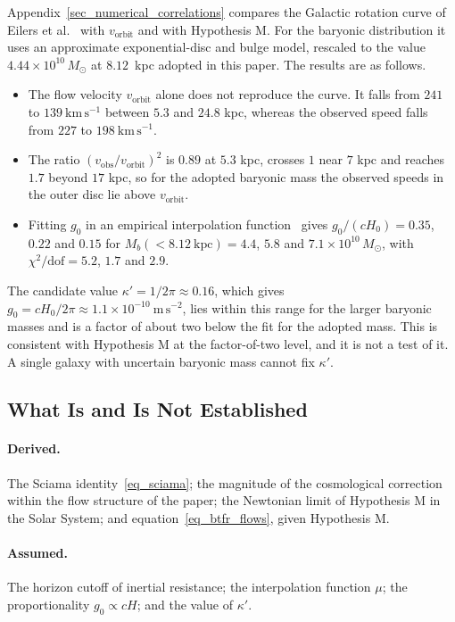 \documentclass[pdflatex,sn-mathphys-num]{sn-jnl}%
\theoremstyle{thmstyleone}%
\theoremstyle{thmstyletwo}%
\theoremstyle{thmstylethree}%
\begin{document}
Appendix~\ref{sec_numerical_correlations} compares the Galactic rotation curve of Eilers et al.~\cite{Eilers_2019} with $v_{\mathrm{orbit}}$ and with Hypothesis M. For the baryonic distribution it uses an approximate exponential-disc and bulge model, rescaled to the value $4.44\times10^{10}\,M_\odot$ at $8.12$~kpc adopted in this paper. The results are as follows.
\begin{itemize}
\item The flow velocity $v_{\mathrm{orbit}}$ alone does not reproduce the curve. It falls from $241$ to $139~\mathrm{km\,s^{-1}}$ between $5.3$ and $24.8$ kpc, whereas the observed speed falls from $227$ to $198~\mathrm{km\,s^{-1}}$.
\item The ratio $(v_{\mathrm{obs}}/v_{\mathrm{orbit}})^{2}$ is $0.89$ at $5.3$ kpc, crosses $1$ near $7$ kpc and reaches $1.7$ beyond $17$ kpc, so for the adopted baryonic mass the observed speeds in the outer disc lie above $v_{\mathrm{orbit}}$.
\item Fitting $g_0$ in an empirical interpolation function~\cite{McGaugh2016RAR} gives $g_0/(cH_0)=0.35$, $0.22$ and $0.15$ for $M_b(<8.12~\mathrm{kpc})=4.4$, $5.8$ and $7.1\times10^{10}\,M_\odot$, with $\chi^{2}/\mathrm{dof}=5.2$, $1.7$ and $2.9$.
\end{itemize}
The candidate value $\kappa'=1/2\pi\approx0.16$, which gives $g_0=cH_0/2\pi\approx1.1\times10^{-10}~\mathrm{m\,s^{-2}}$, lies within this range for the larger baryonic masses and is a factor of about two below the fit for the adopted mass. This is consistent with Hypothesis M at the factor-of-two level, and it is not a test of it. A single galaxy with uncertain baryonic mass cannot fix $\kappa'$.

\subsection{What Is and Is Not Established}

\paragraph{Derived.} The Sciama identity~\eqref{eq_sciama}; the magnitude of the cosmological correction within the flow structure of the paper; the Newtonian limit of Hypothesis M in the Solar System; and equation~\eqref{eq_btfr_flows}, given Hypothesis M.

\paragraph{Assumed.} The horizon cutoff of inertial resistance; the interpolation function $\mu$; the proportionality $g_0\propto cH$; and the value of $\kappa'$.
\end{document}

